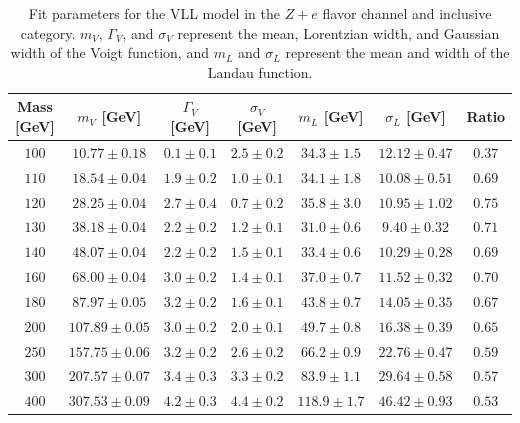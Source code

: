 \begin{table}[h]
 \centering
\scriptsize
\caption{Fit parameters for the VLL model in the $Z+e$ flavor channel and inclusive category. $m_V$, $\Gamma_V$, and $\sigma_V$ represent the mean, Lorentzian width, and Gaussian width of the Voigt function, and $m_L$ and $\sigma_L$ represent the mean and width of the Landau function.}
\begin{tabular}{|c||c|c|c|c|c|c|} 
\hline\hline
Mass [GeV] & $m_V$ [GeV] &  $\Gamma_V$ [GeV] &  $\sigma_V$ [GeV] & $m_L$  [GeV] & $\sigma_L$ [GeV] & Ratio\\
\hline \hline
$100$&$10.77\pm0.18 $&$ 0.1\pm0.1 $&$ 2.5\pm0.2 $&$ 34.3\pm1.5 $&$ 12.12\pm0.47$&$0.37$\\ 
$110$&$18.54\pm0.04 $&$ 1.9\pm0.2 $&$ 1.0\pm0.1 $&$ 34.1\pm1.8 $&$ 10.08\pm0.51$&$0.69$\\ 
$120$&$28.25\pm0.04 $&$ 2.7\pm0.4 $&$ 0.7\pm0.2 $&$ 35.8\pm3.0 $&$ 10.95\pm1.02$&$0.75$ \\ 
$130$&$38.18\pm0.04 $&$ 2.2\pm0.2 $&$ 1.2\pm0.1$&$ 31.0\pm0.6 $&$ 9.40\pm0.32$&$0.71$ \\ 
$140$&$48.07\pm0.04 $&$ 2.2\pm0.2 $&$ 1.5\pm0.1 $&$ 33.4\pm0.6 $&$ 10.29\pm0.28$&$0.69$ \\ 
$160$&$68.00\pm0.04 $&$ 3.0\pm0.2 $&$ 1.4\pm0.1 $&$ 37.0\pm0.7 $&$ 11.52\pm0.32$&$0.70$ \\ 
$180$&$87.97\pm0.05 $&$ 3.2\pm0.2 $&$ 1.6\pm0.1 $&$ 43.8\pm0.7 $&$ 14.05\pm0.35$&$0.67$ \\ 
$200$&$107.89\pm0.05 $&$ 3.0\pm0.2 $&$ 2.0\pm0.1 $&$ 49.7\pm0.8 $&$ 16.38\pm0.39$&$0.65$ \\ 
$250$&$157.75\pm0.06 $&$ 3.2\pm0.2 $&$ 2.6\pm0.2 $&$ 66.2\pm0.9 $&$ 22.76\pm0.47$&$0.59$ \\ 
$300$&$207.57\pm0.07 $&$ 3.4\pm0.3 $&$ 3.3\pm0.2 $&$ 83.9\pm1.1 $&$ 29.64\pm0.58$&$0.57$ \\ 
$400$&$307.53\pm0.09 $&$ 4.2\pm0.3 $&$ 4.4\pm0.2 $&$ 118.9\pm1.7 $&$ 46.42\pm0.93$&$0.53$ \\ 
 \hline\hline
\end{tabular} 
   \label{table:ZeFitParamsVLL}
\end{table}


